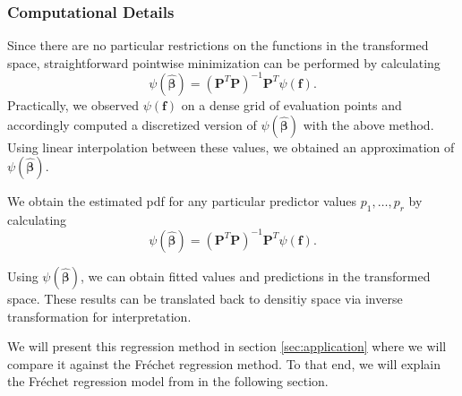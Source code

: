 \subsubsection{Computational Details}
\label{sec:com_details_func_reg}
Since there are no particular restrictions on the functions in the transformed space,
straightforward pointwise minimization can be performed by calculating
\begin{equation}
    \psi(\hat{\boldsymbol{\beta}})
    = \left(\mathbf{P}^T \mathbf{P}\right)^{-1} \mathbf{P}^T \psi(\mathbf{f}).
\end{equation}
Practically, we observed $\psi(\mathbf{f})$ on a dense grid of evaluation points and
accordingly computed a discretized version of $\psi(\hat{\boldsymbol{\beta}})$ with the
above method. Using linear interpolation between these values, we obtained an approximation
of $\psi(\hat{\boldsymbol{\beta}})$.

We obtain the estimated pdf for any particular predictor values $p_1, \dots, p_r$ by
calculating
\begin{equation}
    \psi(\hat{\boldsymbol{\beta}})
    = \left(\mathbf{P}^T \mathbf{P}\right)^{-1} \mathbf{P}^T \psi(\mathbf{f}).
\end{equation}

Using $\psi(\hat{\boldsymbol{\beta}})$, we can obtain fitted values and predictions in
the transformed space. These results can be translated back to densitiy space via
inverse transformation for interpretation.

We will present this regression method in section \ref{sec:application} where we will
compare it against the Fréchet regression method. To that end, we will explain the
Fréchet regression model from \textcite{PetersenMüller2019} in the following section.
